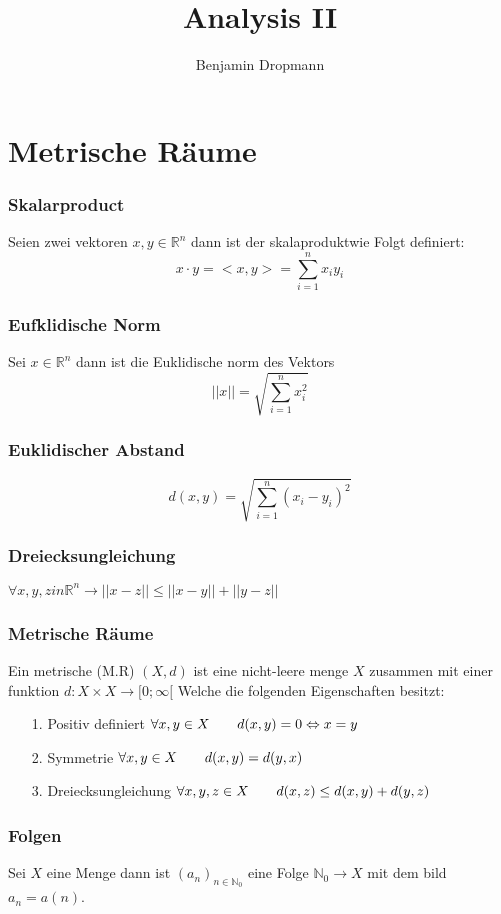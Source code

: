 \documentclass{article}
\author{Benjamin Dropmann}
\title{Analysis II}
\newcommand{\mspc}{\hspace{0.7cm}}
\begin{document}
\maketitle

\section{Metrische Räume}
\subsubsection*{Skalarproduct} Seien zwei vektoren $x,y\in\mathbb{R}^n$ dann ist der skalaproduktwie Folgt definiert: \[x\cdot y=<x,y>=\sum_{i=1}^nx_iy_i\]
\subsubsection*{Eufklidische Norm} Sei $x\in \mathbb{R}^n$ dann ist die Euklidische norm des Vektors \[||x||=\sqrt{\sum_{i=1}^nx_i^2}\]
\subsubsection*{Euklidischer Abstand  } \[d(x,y)=\sqrt{\sum^n_{i=1}(x_i-y_i)^2}\]
\subsubsection*{Dreiecksungleichung  }$\forall x,y,zin\mathbb{R}^n\rightarrow||x-z||\le||x-y||+||y-z||$
\subsubsection*{Metrische Räume} Ein metrische (M.R) $(X,d)$ ist eine nicht-leere menge $X$ zusammen mit einer funktion $d:X\times X\rightarrow[0;\infty[$ Welche die folgenden Eigenschaften besitzt:
\begin{itemize}
\item[1.]{Positiv definiert $\forall x,y\in X\mspc d(x,y)=0\Leftrightarrow x=y$}
\item[2.]{Symmetrie $\forall x,y \in X\mspc d(x,y)=d(y,x)$}
\item[3.]{Dreiecksungleichung $\forall x,y,z\in X\mspc d(x,z)\le d(x,y)+d(y,z)$}
\end{itemize}
\subsubsection*{Folgen} Sei $X$ eine Menge dann ist $(a_n)_{n\in\mathbb{N}_0}$ eine Folge $\mathbb{N}_0\rightarrow X$ mit dem bild $a_n=a(n)$.
\end{document}
